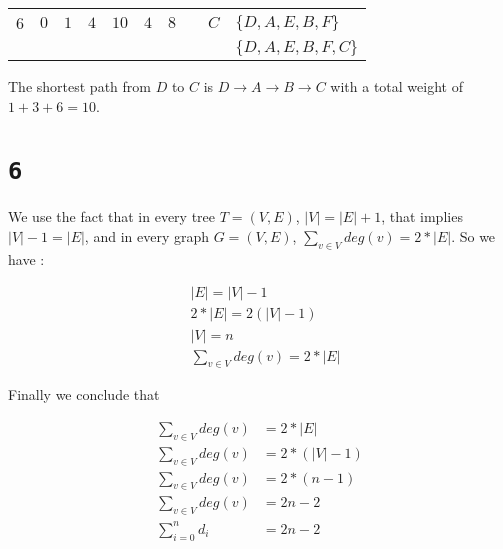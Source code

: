 \documentclass[a4paper,11pt]{report}
\begin{document}
\begin{table}[h]
\begin{tabular}{llllllllll}
\multicolumn{1}{|l|}{6} & $0$                          & $1$                          & $4$                          & $10$                         & $4$                          & $8$                          &                       & $C$                          & $\{D,A,E,B,F\}$                  \\ \cline{1-1}
                        &                              &                              &                              &                              &                              &                              &                       &                              & $\{D,A,E,B,F,C\}$               
\end{tabular}
\end{table}

The shortest path from $D$ to $C$ is $D \rightarrow A \rightarrow B \rightarrow
C$ with a total weight of $1+3+6 = 10$.

\section*{\texttt{6}}

We use the fact that in every tree $T = (V,E)$, $|V| = |E| + 1$, that implies
$|V| - 1 = |E|$, and in every graph $G = (V,E)$, $\sum_{v \in V} deg(v) =
2*|E|$. So we have :

\begin{align*}
  & |E| = |V| - 1 \\
  & 2*|E| = 2(|V| - 1) \\
  & |V| = n \\
  & \sum_{v \in V} deg(v) = 2*|E|
\end{align*}

Finally we conclude that

\begin{align*}
  \sum_{v \in V} deg(v) &= 2*|E| \\
  \sum_{v \in V} deg(v) &= 2*(|V| - 1) \\
  \sum_{v \in V} deg(v) &= 2*(n - 1) \\
  \sum_{v \in V} deg(v) &= 2n - 2 \\
  \sum_{i=0}^n d_i &= 2n - 2
\end{align*}
\end{document}
